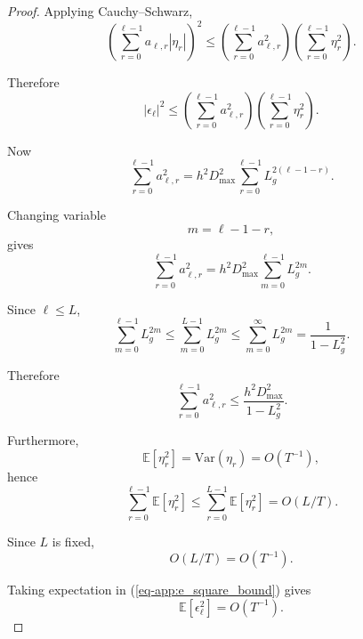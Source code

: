 \documentclass[10pt]{iopart}
\newcommand{\1}{\mathbf{1}}
\begin{document}
\begin{proof}
Applying Cauchy--Schwarz,
\begin{equation}
\left(
\sum_{r=0}^{\ell-1}
a_{\ell,r}|\eta_r|
\right)^2
\le
\left(
\sum_{r=0}^{\ell-1}a_{\ell,r}^2
\right)
\left(
\sum_{r=0}^{\ell-1}\eta_r^2
\right).
\label{eq-app:CS}
\end{equation}

Therefore
\begin{equation}
|\epsilon_\ell|^2
\le
\left(
\sum_{r=0}^{\ell-1}a_{\ell,r}^2
\right)
\left(
\sum_{r=0}^{\ell-1}\eta_r^2
\right).
\label{eq-app:e_square_bound}
\end{equation}

Now
\begin{equation}
\sum_{r=0}^{\ell-1}a_{\ell,r}^2
=
h^2D_{\max}^2
\sum_{r=0}^{\ell-1}
L_g^{2(\ell-1-r)}.
\label{eq-app:a_sum}
\end{equation}

Changing variable
\begin{equation}
m=\ell-1-r,
\label{eq-app:m_change}
\end{equation}
gives
\begin{equation}
\sum_{r=0}^{\ell-1}a_{\ell,r}^2
=
h^2D_{\max}^2
\sum_{m=0}^{\ell-1}L_g^{2m}.
\label{eq-app:a_sum2}
\end{equation}

Since $\ell\le L$,
\begin{equation}
\sum_{m=0}^{\ell-1}L_g^{2m}
\le
\sum_{m=0}^{L-1}L_g^{2m}
\le
\sum_{m=0}^{\infty}L_g^{2m}
=
\frac{1}{1-L_g^2}.
\label{eq-app:geom_sum}
\end{equation}

Therefore
\begin{equation}
\sum_{r=0}^{\ell-1}a_{\ell,r}^2
\le
\frac{h^2D_{\max}^2}{1-L_g^2}.
\label{eq-app:a_uniform}
\end{equation}

Furthermore,
\begin{equation}
\mathbb E[\eta_r^2]
=
\mathrm{Var}(\eta_r)
=
O(T^{-1}),
\label{eq-app:eta_second}
\end{equation}
hence
\begin{equation}
\sum_{r=0}^{\ell-1}\mathbb E[\eta_r^2]
\le
\sum_{r=0}^{L-1}\mathbb E[\eta_r^2]
=
O(L/T).
\label{eq-app:eta_sum}
\end{equation}

Since $L$ is fixed,
\begin{equation}
O(L/T)=O(T^{-1}).
\label{eq-app:L_fixed}
\end{equation}

Taking expectation in (\ref{eq-app:e_square_bound}) gives
\begin{equation}
\mathbb E[\epsilon_\ell^2]
=
O(T^{-1}).
\label{eq-app:e_second}
\end{equation}


\end{proof}
\end{document}
